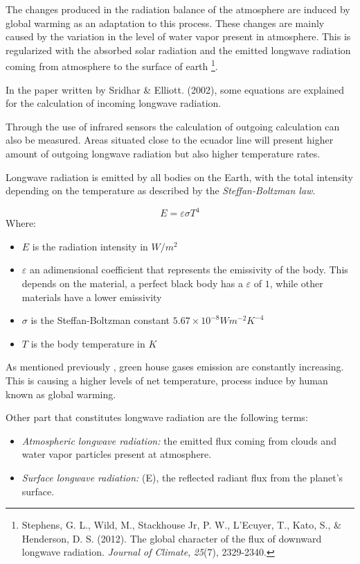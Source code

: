 \documentclass[
]{article}
\providecommand{\tightlist}{%
  \setlength{\itemsep}{0pt}\setlength{\parskip}{0pt}}
\begin{document}
The changes produced in the radiation balance of the atmosphere are
induced by global warming as an adaptation to this process. These
changes are mainly caused by the variation in the level of water vapor
present in atmosphere. This is regularized with the absorbed solar
radiation and the emitted longwave radiation coming from atmosphere to
the surface of earth \footnote{Stephens, G. L., Wild, M., Stackhouse Jr,
  P. W., L'Ecuyer, T., Kato, S., \& Henderson, D. S. (2012). The global
  character of the flux of downward longwave radiation. \emph{Journal of
  Climate}, \emph{25}(7), 2329-2340.}.

In the paper written by Sridhar \& Elliott. (2002), some equations are
explained for the calculation of incoming longwave radiation.

Through the use of infrared sensors the calculation of outgoing
calculation can also be measured. Areas situated close to the ecuador
line will present higher amount of outgoing longwave radiation but also
higher temperature rates.

Longwave radiation is emitted by all bodies on the Earth, with the total
intensity depending on the temperature as described by the
\emph{Steffan-Boltzman law}.

\[E = \varepsilon \sigma T^4\] Where:

\begin{itemize}
\tightlist
\item
  \(E\) is the radiation intensity in \(W/m^2\)
\item
  \(\varepsilon\) an adimensional coefficient that represents the
  emissivity of the body. This depends on the material, a perfect black
  body has a \(\varepsilon\) of \(1\), while other materials have a
  lower emissivity
\item
  \(\sigma\) is the Steffan-Boltzman constant
  \(5.67 \times 10^{-8} W m^{-2} K^{-4}\)
\item
  \(T\) is the body temperature in \(K\)
\end{itemize}

As mentioned previously , green house gases emission are constantly
increasing. This is causing a higher levels of net temperature, process
induce by human known as global warming.

Other part that constitutes longwave radiation are the following terms:

\begin{itemize}
\item
  \emph{Atmospheric longwave radiation:} the emitted flux coming from
  clouds and water vapor particles present at atmosphere.
\item
  \emph{Surface longwave radiation:} (E), the reflected radiant flux
  from the planet's surface.
\end{itemize}
\end{document}
